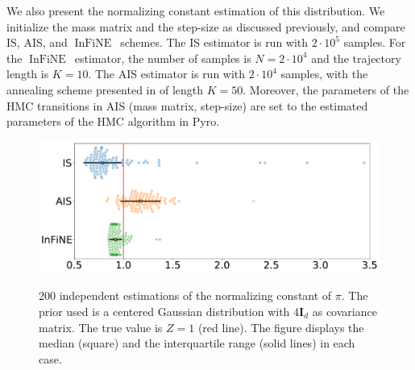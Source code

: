 \documentclass{article}
\def\IFIS{\ensuremath{\operatorname{InFiNE}}}
\def\InFiNE{{\small \IFIS}}
\newcommand{\1}{\mathds{1}}
\begin{document}
We also present the normalizing constant estimation of this distribution. We initialize the mass matrix and the step-size as discussed previously, and compare IS, AIS, and \InFiNE\ schemes.
The IS estimator is run with $2\cdot 10^5$ samples.
For the \IFIS\ estimator, the number of samples is $N = 2\cdot 10^4$ and the trajectory length is $K=10$. The AIS estimator is run with $2\cdot 10^4$ samples, with the annealing scheme presented in \cite[Section 6.2]{grosse2015sandwiching} of length $K=50$. Moreover, the parameters of the HMC transitions in AIS (mass matrix, step-size) are set to the estimated parameters of the HMC algorithm in Pyro. 
\begin{figure}[!ht]
    \centering
    \includegraphics[width=0.7 \linewidth]{funnel.pdf}
    \label{fig:funnel_estimation}
    \caption{200 independent estimations of the normalizing constant of $\pi$. The prior used is a centered Gaussian distribution with $4\mathbf{I}_d$ as covariance matrix. The true value is $Z=1$ (red line). The figure displays the median (square) and the interquartile range (solid lines) in each case.}
\end{figure}
\end{document}
